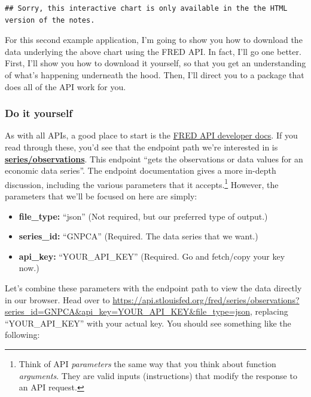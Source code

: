 \documentclass[
]{article}
\providecommand{\tightlist}{%
  \setlength{\itemsep}{0pt}\setlength{\parskip}{0pt}}
\begin{document}
\begin{verbatim}
## Sorry, this interactive chart is only available in the the HTML version of the notes.
\end{verbatim}

For this second example application, I'm going to show you how to
download the data underlying the above chart using the FRED API. In
fact, I'll go one better. First, I'll show you how to download it
yourself, so that you get an understanding of what's happening
underneath the hood. Then, I'll direct you to a package that does all of
the API work for you.

\hypertarget{do-it-yourself}{%
\subsubsection{Do it yourself}\label{do-it-yourself}}

As with all APIs, a good place to start is the
\href{https://research.stlouisfed.org/docs/api/fred/}{FRED API developer
docs}. If you read through these, you'd see that the endpoint path we're
interested in is
\href{https://research.stlouisfed.org/docs/api/fred/series_observations.html}{\textbf{series/observations}}.
This endpoint ``gets the observations or data values for an economic
data series''. The endpoint documentation gives a more in-depth
discussion, including the various parameters that it accepts.\footnote{Think
  of API \emph{parameters} the same way that you think about function
  \emph{arguments}. They are valid inputs (instructions) that modify the
  response to an API request.} However, the parameters that we'll be
focused on here are simply:

\begin{itemize}
\tightlist
\item
  \textbf{file\_type:} ``json'' (Not required, but our preferred type of
  output.)
\item
  \textbf{series\_id:} ``GNPCA'' (Required. The data series that we
  want.)
\item
  \textbf{api\_key:} ``YOUR\_API\_KEY'' (Required. Go and fetch/copy
  your key now.)
\end{itemize}

Let's combine these parameters with the endpoint path to view the data
directly in our browser. Head over to
\href{https://api.stlouisfed.org/fred/series/observations?series_id=GNPCA\&api_key=YOUR_API_KEY\&file_type=json}{https://api.stlouisfed.org/fred/series/observations?series\_id=GNPCA\&api\_key=YOUR\_API\_KEY\&file\_type=json},
replacing ``YOUR\_API\_KEY'' with your actual key. You should see
something like the following:
\end{document}
